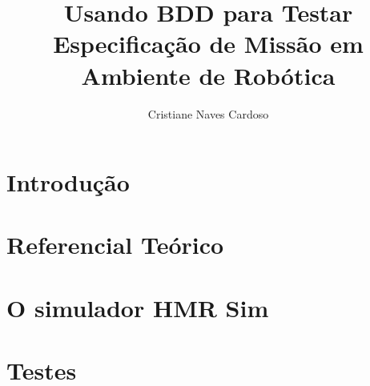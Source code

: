 \documentclass[bacharelado]{packages/unb-cic}%
\author{Cristiane Naves Cardoso}
\title{Usando BDD para Testar Especificação de Missão em Ambiente de Robótica}
\begin{document}
\maketitle

\pretextual



\begin{abstract}%

% 

\end{abstract}

\tableofcontents
\listoffigures
\listoftables

\textual

\chapter{Introdução}
\label{chap:introduction}


\chapter{Referencial Teórico}
\label{chap:background}


\chapter{O simulador HMR Sim}


\chapter{Testes}
\label{chap:tests}


% 

% 

% 
%

\postextual
\anexos




\end{document}

